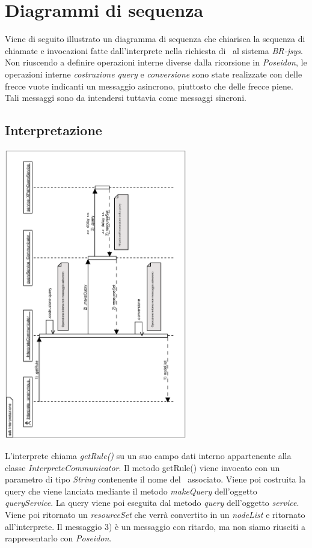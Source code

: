\documentclass[11pt,titlepage,a4paper]{report}
\begin{document}
\section{Diagrammi di sequenza}
Viene di seguito illustrato un diagramma di sequenza che chiarisca la sequenza di chiamate e invocazioni fatte dall'interprete nella richiesta di \brs\ al sistema \textit{BR-jsys}. Non riuscendo a definire operazioni interne diverse dalla ricorsione in \textit{Poseidon}, le operazioni interne \textit{costruzione query} e \textit{conversione} sono state realizzate con delle frecce vuote indicanti un messaggio asincrono, piuttosto che delle frecce piene. Tali messaggi sono da intendersi tuttavia come messaggi sincroni.
\subsection{Interpretazione}
\begin{center}
 \includegraphics[width=0.6\textwidth, angle=-90]{Interpretazione-cld.eps}
\end{center}
L'interprete chiama \textit{getRule()} su un suo campo dati interno appartenente alla classe \textit{InterpreteCommunicator}. Il metodo getRule() viene invocato con un parametro di tipo \textit{String} contenente il nome del \bo\ associato. Viene poi costruita la query che viene lanciata mediante il metodo \textit{makeQuery} dell'oggetto \textit{queryService}. La query viene poi eseguita dal metodo \textit{query} dell'oggetto \textit{service}. Viene poi ritornato un \textit{resourceSet} che verr\`a convertito in un \textit{nodeList} e ritornato all'interprete. Il messaggio 3) \`e un messaggio con ritardo, ma non siamo riusciti a rappresentarlo con \textit{Poseidon}.
\end{document}
